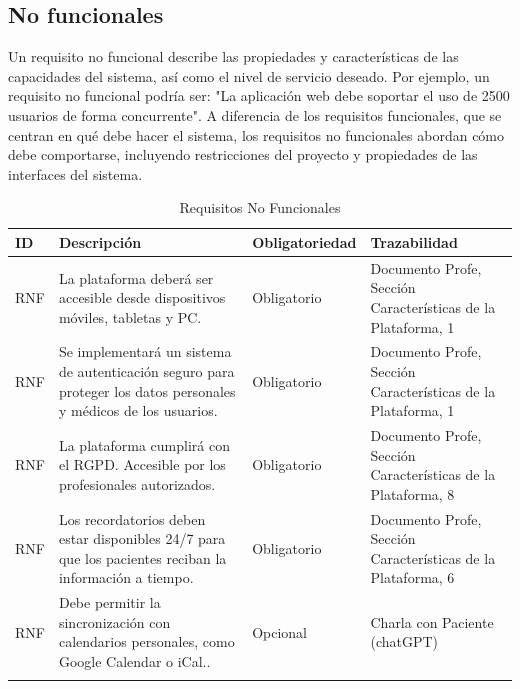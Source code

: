 \documentclass{article}
\begin{document}
\subsection{No funcionales}

Un requisito no funcional describe las propiedades y características de las capacidades del sistema, así como el nivel de servicio deseado. Por ejemplo, un requisito no funcional podría ser: "La aplicación web debe soportar el uso de 2500 usuarios de forma concurrente". A diferencia de los requisitos funcionales, que se centran en qué debe hacer el sistema, los requisitos no funcionales abordan cómo debe comportarse, incluyendo restricciones del proyecto y propiedades de las interfaces del sistema.

\begin{table}[H]
	\centering
	\caption{Requisitos No Funcionales}
	\begin{tabular}{@{} p{2.5cm} p{6.5cm} p{3cm} p{3cm} @{}}
		\toprule
		\textbf{ID} & \textbf{Descripción} & \textbf{Obligatoriedad} & \textbf{Trazabilidad} \\
		\midrule
		\addlinespace
		\stepcounter{requisitosNoFuncionales} RNF\therequisitosNoFuncionales & La plataforma deberá ser accesible desde dispositivos móviles, tabletas y PC. & Obligatorio & Documento Profe, Sección Características de la Plataforma, 1 \\
		\addlinespace
		\stepcounter{requisitosNoFuncionales} RNF\therequisitosNoFuncionales & Se implementará un sistema de autenticación seguro para proteger los datos personales y médicos de los usuarios. & Obligatorio & Documento Profe, Sección Características de la Plataforma, 1 \\
		\addlinespace
		\stepcounter{requisitosNoFuncionales} RNF\therequisitosNoFuncionales &La plataforma cumplirá con el RGPD. Accesible por los profesionales autorizados. & Obligatorio & Documento Profe, Sección Características de la Plataforma, 8 \\
		\addlinespace
		\stepcounter{requisitosNoFuncionales}
		RNF\therequisitosNoFuncionales & Los recordatorios deben estar disponibles 24/7 para que los pacientes reciban la información a tiempo. & Obligatorio & Documento Profe, Sección Características de la Plataforma, 6 \\
		\addlinespace
		\stepcounter{requisitosNoFuncionales}
		RNF\therequisitosNoFuncionales &  Debe permitir la sincronización con calendarios personales, como Google Calendar o iCal.. & Opcional & Charla con Paciente (chatGPT) \\
		\addlinespace
		
		\bottomrule
	\end{tabular}
\end{table}
\end{document}
